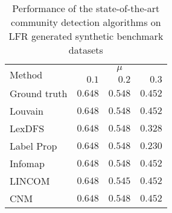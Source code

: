 \documentclass{article}
\begin{document}
\begin{table}[htb]
\centering
\caption{Performance of the state-of-the-art community detection algorithms on LFR generated synthetic benchmark datasets}
\label{tab:lfr}
\vspace{0.1in}

\begin{tabular}{@{}lrrr@{}}
	\toprule
	\multirow{2}{*}{Method} & \multicolumn{3}{c}{$\mu$} \\ \cmidrule{2-4}
	 & $0.1$ & $0.2$ &  $0.3$ \\
	\midrule 
    Ground truth & $0.648$ & $0.548$  &  $0.452$ \\  
	Louvain &  $0.648$  &    $0.548$ &   $0.452$ \\  
	 LexDFS &  $0.648$ &    $0.548$ &    $0.328$ \\  
	Label Prop &  $0.648$ &    $0.548$  &    $0.230$ \\  
	Infomap &  $0.648$ &     $0.548$ &    $0.452$ \\  
    LINCOM &  $0.648$  &    $0.545$  &    $0.452$ \\  
    CNM  & $0.648$ &     $0.548$ &    $0.452$ \\ \bottomrule
\end{tabular}
\end{table}
\end{document}
